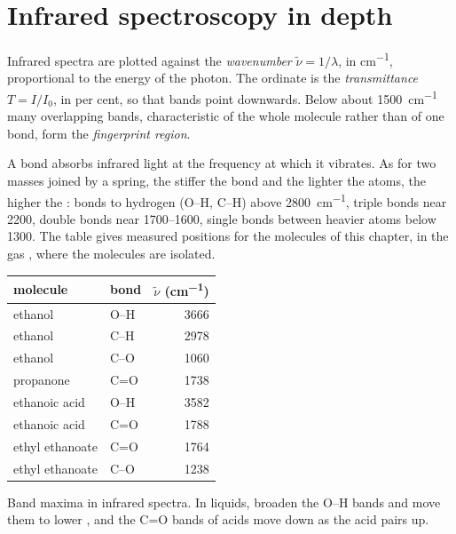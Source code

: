 \section{Infrared spectroscopy in depth}

\begin{definition}\label{def:b1:structure-spectroscopy:wavenumber}
Infrared spectra are plotted against the \emph{wavenumber}
$\tilde\nu = 1/\lambda$, in \unit{cm^{-1}}, proportional to the energy of the
photon. The ordinate is the \emph{transmittance}
$T = I/I_0$, in per cent, so that bands point downwards. Below about
\qty{1500}{cm^{-1}} many overlapping bands, characteristic of the whole
molecule rather than of one bond, form the \emph{fingerprint
region}.
\end{definition}

A bond absorbs infrared light at the frequency at which it vibrates. As
for two masses joined by a spring, the stiffer the bond and the lighter
the atoms, the higher the : bonds to hydrogen (O--H, C--H)
above \qty{2800}{cm^{-1}}, triple bonds near 2200, double bonds near
1700--1600, single bonds between heavier atoms below 1300. The table gives
measured positions for the molecules of this chapter, in the gas ,
where the molecules are isolated.

\begin{omfigure}
\begin{tabular}{llr}
\hline
molecule & bond & $\tilde\nu$ (\unit{cm^{-1}}) \\
\hline
ethanol & O--H & 3666 \\
ethanol & C--H & 2978 \\
ethanol & C--O & 1060 \\
propanone & C=O & 1738 \\
ethanoic acid & O--H & 3582 \\
ethanoic acid & C=O & 1788 \\
ethyl ethanoate & C=O & 1764 \\
ethyl ethanoate & C--O & 1238 \\
\hline
\end{tabular}

\smallskip
{\small Band maxima in  infrared spectra. In liquids,  broaden the O--H bands and move them to lower , and the
C=O bands of acids move down as the acid pairs up.}
\end{omfigure}

